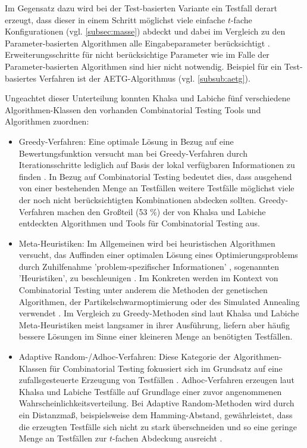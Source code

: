 Im Gegensatz dazu wird bei der Test-basierten Variante ein Testfall derart erzeugt, dass dieser in einem Schritt möglichst viele einfache $t$-fache Konfigurationen (vgl. \autoref{subsec:masse}) abdeckt und dabei im Vergleich zu den Parameter-basierten Algorithmen alle Eingabeparameter berücksichtigt \cite{khalsa2014orchestrated}. Erweiterungsschritte für nicht berücksichtige Parameter wie im Falle der Parameter-basierten Algorithmen sind hier nicht notwendig. Beispiel für ein Test-basiertes Verfahren ist der AETG-Algorithmus (vgl. \autoref{subsub:aetg}). 

Ungeachtet dieser Unterteilung konnten Khalsa und Labiche \cite{khalsa2014orchestrated} fünf verschiedene Algorithmen-Klassen den vorhanden Combinatorial Testing Tools und Algorithmen zuordnen:
\begin{itemize}
\item Greedy-Verfahren: Eine optimale Lösung in Bezug auf eine Bewertungsfunktion versucht man bei Greedy-Verfahren durch Iterationsschritte lediglich auf Basis der lokal verfügbaren Informationen zu finden \cite[S. 185]{schoening2001algorithmik}. In Bezug auf Combinatorial Testing bedeutet dies, dass ausgehend von einer bestehenden Menge an Testfällen weitere Testfälle möglichst viele der noch nicht berücksichtigten Kombinationen abdecken \cite{khalsa2014orchestrated} sollten. Greedy-Verfahren machen den Großteil (53 \%) der von Khalsa und Labiche \cite{khalsa2014orchestrated} entdeckten Algorithmen und Tools für Combinatorial Testing aus.
\item Meta-Heuristiken: Im Allgemeinen wird bei heuristischen Algorithmen versucht, das Auffinden einer optimalen Lösung eines Optimierungsproblems durch Zuhilfenahme 'problem-spezifischer Informationen' \cite[S. 319]{schoening2001algorithmik}, sogenannten 'Heuristiken', zu beschleunigen \cite[S. 319]{schoening2001algorithmik}. Im Konkreten werden im Kontext von Combinatorial Testing unter anderem die Methoden der genetischen Algorithmen, der Partikelschwarmoptimierung oder des Simulated Annealing verwendet \cite{khalsa2014orchestrated}. Im Vergleich zu Greedy-Methoden sind laut Khalsa und Labiche \cite{khalsa2014orchestrated} Meta-Heuristiken meist langsamer in ihrer Ausführung, liefern aber häufig bessere Lösungen im Sinne einer kleineren Menge an benötigten Testfällen.
\item Adaptive Random-/Adhoc-Verfahren: Diese Kategorie der Algorithmen-Klassen für Combinatorial Testing fokussiert sich im Grundsatz auf eine zufallsgesteuerte Erzeugung von Testfällen \cite{khalsa2014orchestrated}. Adhoc-Verfahren erzeugen laut Khalsa und Labiche \cite{khalsa2014orchestrated} Testfälle auf Grundlage einer zuvor angenommenen Wahrscheinlichkeitsverteilung. Bei Adaptive Random-Methoden wird durch ein Distanzmaß, beispielsweise dem Hamming-Abstand, gewährleistet, dass die erzeugten Testfälle sich nicht zu stark überschneiden und so eine geringe Menge an Testfällen zur $t$-fachen Abdeckung ausreicht \cite{khalsa2014orchestrated}. 

\end{itemize}
